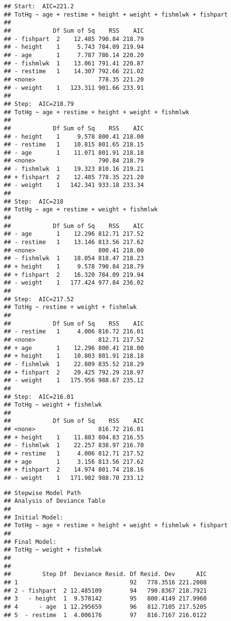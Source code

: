 \documentclass[12pt,]{article}
\newenvironment{Shaded}{\begin{snugshade}}{\end{snugshade}}
\newcommand{\CommentTok}[1]{\textcolor[rgb]{0.56,0.35,0.01}{\textit{#1}}}
\newcommand{\OperatorTok}[1]{\textcolor[rgb]{0.81,0.36,0.00}{\textbf{#1}}}
\newcommand{\NormalTok}[1]{#1}
\begin{document}
\begin{verbatim}
## Start:  AIC=221.2
## TotHg ~ age + restime + height + weight + fishmlwk + fishpart
## 
##            Df Sum of Sq    RSS    AIC
## - fishpart  2    12.485 790.84 218.79
## - height    1     5.743 784.09 219.94
## - age       1     7.787 786.14 220.20
## - fishmlwk  1    13.061 791.41 220.87
## - restime   1    14.307 792.66 221.02
## <none>                  778.35 221.20
## - weight    1   123.311 901.66 233.91
## 
## Step:  AIC=218.79
## TotHg ~ age + restime + height + weight + fishmlwk
## 
##            Df Sum of Sq    RSS    AIC
## - height    1     9.578 800.41 218.00
## - restime   1    10.815 801.65 218.15
## - age       1    11.071 801.91 218.18
## <none>                  790.84 218.79
## - fishmlwk  1    19.323 810.16 219.21
## + fishpart  2    12.485 778.35 221.20
## - weight    1   142.341 933.18 233.34
## 
## Step:  AIC=218
## TotHg ~ age + restime + weight + fishmlwk
## 
##            Df Sum of Sq    RSS    AIC
## - age       1    12.296 812.71 217.52
## - restime   1    13.146 813.56 217.62
## <none>                  800.41 218.00
## - fishmlwk  1    18.054 818.47 218.23
## + height    1     9.578 790.84 218.79
## + fishpart  2    16.320 784.09 219.94
## - weight    1   177.424 977.84 236.02
## 
## Step:  AIC=217.52
## TotHg ~ restime + weight + fishmlwk
## 
##            Df Sum of Sq    RSS    AIC
## - restime   1     4.006 816.72 216.01
## <none>                  812.71 217.52
## + age       1    12.296 800.41 218.00
## + height    1    10.803 801.91 218.18
## - fishmlwk  1    22.809 835.52 218.29
## + fishpart  2    20.425 792.29 218.97
## - weight    1   175.956 988.67 235.12
## 
## Step:  AIC=216.01
## TotHg ~ weight + fishmlwk
## 
##            Df Sum of Sq    RSS    AIC
## <none>                  816.72 216.01
## + height    1    11.883 804.83 216.55
## - fishmlwk  1    22.257 838.97 216.70
## + restime   1     4.006 812.71 217.52
## + age       1     3.156 813.56 217.62
## + fishpart  2    14.974 801.74 218.16
## - weight    1   171.982 988.70 233.12
\end{verbatim}

\begin{Shaded}
\end{Shaded}

\begin{verbatim}
## Stepwise Model Path 
## Analysis of Deviance Table
## 
## Initial Model:
## TotHg ~ age + restime + height + weight + fishmlwk + fishpart
## 
## Final Model:
## TotHg ~ weight + fishmlwk
## 
## 
##         Step Df  Deviance Resid. Df Resid. Dev      AIC
## 1                                92   778.3516 221.2008
## 2 - fishpart  2 12.485109        94   790.8367 218.7921
## 3   - height  1  9.578142        95   800.4149 217.9960
## 4      - age  1 12.295659        96   812.7105 217.5205
## 5  - restime  1  4.006176        97   816.7167 216.0122
\end{verbatim}
\end{document}
